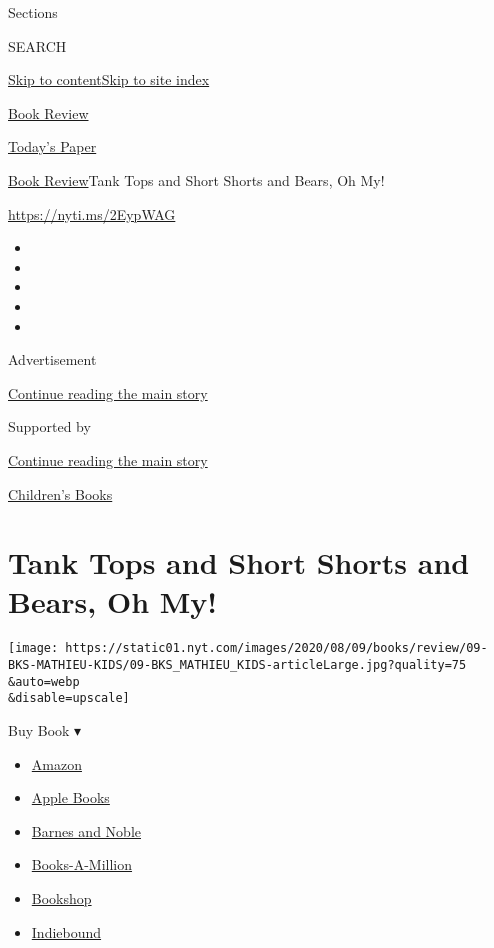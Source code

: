 Sections

SEARCH

\protect\hyperlink{site-content}{Skip to
content}\protect\hyperlink{site-index}{Skip to site index}

\href{https://www.nytimes.com/section/books/review}{Book Review}

\href{https://myaccount.nytimes.com/auth/login?response_type=cookie\&client_id=vi}{}

\href{https://www.nytimes.com/section/todayspaper}{Today's Paper}

\href{/section/books/review}{Book Review}\textbar{}Tank Tops and Short
Shorts and Bears, Oh My!

\url{https://nyti.ms/2EypWAG}

\begin{itemize}
\item
\item
\item
\item
\item
\end{itemize}

Advertisement

\protect\hyperlink{after-top}{Continue reading the main story}

Supported by

\protect\hyperlink{after-sponsor}{Continue reading the main story}

\href{/column/childrens-books}{Children's Books}

\hypertarget{tank-tops-and-short-shorts-and-bears-oh-my}{%
\section{Tank Tops and Short Shorts and Bears, Oh
My!}\label{tank-tops-and-short-shorts-and-bears-oh-my}}

\texttt{[image: https://static01.nyt.com/images/2020/08/09/books/review/09-BKS-MATHIEU-KIDS/09-BKS\_MATHIEU\_KIDS-articleLarge.jpg?quality=75\\\&auto=webp\\\&disable=upscale]}

Buy Book ▾

\begin{itemize}
\tightlist
\item
  \href{https://www.amazon.com/gp/search?index=books\&tag=NYTBSREV-20\&field-keywords=Dress+Coded+Carrie+Firestone}{Amazon}
\item
  \href{https://du-gae-books-dot-nyt-du-prd.appspot.com/buy?title=Dress+Coded\&author=Carrie+Firestone}{Apple
  Books}
\item
  \href{https://www.anrdoezrs.net/click-7990613-11819508?url=https\%3A\%2F\%2Fwww.barnesandnoble.com\%2Fw\%2F\%3Fean\%3D9781984816436}{Barnes
  and Noble}
\item
  \href{https://www.anrdoezrs.net/click-7990613-35140?url=https\%3A\%2F\%2Fwww.booksamillion.com\%2Fp\%2FDress\%2BCoded\%2FCarrie\%2BFirestone\%2F9781984816436}{Books-A-Million}
\item
  \href{https://bookshop.org/a/3546/9781984816436}{Bookshop}
\item
  \href{https://www.indiebound.org/book/9781984816436?aff=NYT}{Indiebound}
\end{itemize}

